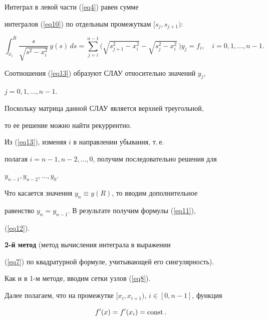 \begin{pf}


Интеграл в левой части (\ref{eq4}) равен сумме


интегралов (\ref{eq10}) по отдельным промежуткам $[s_j,s_{j+1})$:


\begin{equation}


\label{eq13}


\int_{x_i}^R\frac{s}{\sqrt{s^2-x_i^2}}\,y(s)\,ds=


\sum_{j=i}^{n-1}\big(\sqrt{s_{j+1}^2-x_i^2}-


\sqrt{s_j^2-x_i^2}\,\big)y_j=f_i,


\quad i=0,1,\dotsc,n-1.


\end{equation}


Соотношения (\ref{eq13}) образуют СЛАУ относительно значений $y_j$,


$j=0,1,\dotsc,n-1$.


Поскольку матрица данной СЛАУ является верхней треугольной,


то ее решение можно найти рекуррентно.


Из (\ref{eq13}), изменяя $i$ в направлении убывания, т.\,е.


полагая $i=n-1,n-2,\dotsc,0$, получим последовательно решения для


$y_{n-1},y_{n-2},\dotsc,y_0$.


Что касается значения $y_n\equiv y(R)$, то вводим дополнительное


равенство $y_n=y_{n-1}$. В результате получим формулы (\ref{eq11}),


(\ref{eq12}).


\end{pf}








{\bf 2-й метод} (метод вычисления интеграла в выражении


(\ref{eq7}) по квадратурной формуле, учитывающей его сингулярность).


Как и в 1-м методе, вводим сетки узлов (\ref{eq8}).


Далее полагаем, что на промежутке $[x_i,x_{i+1})$, $i\in[0,n-1]$, функция


\begin{equation}


\label{eq14}


f'(x)=f'(x_i)=\const.


\end{equation}


